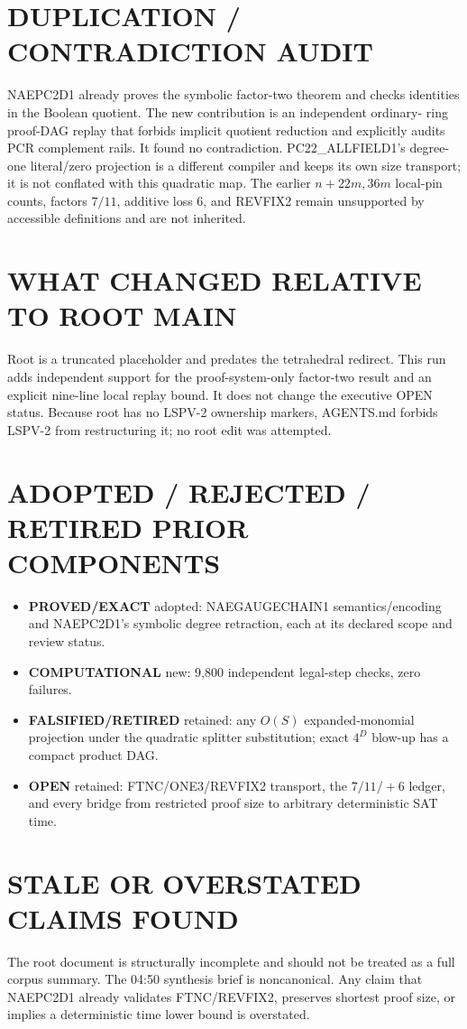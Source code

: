 \documentclass[11pt]{article}
\newcommand{\EXACT}{\textbf{PROVED/EXACT}}
\newcommand{\COMP}{\textbf{COMPUTATIONAL}}
\newcommand{\OPEN}{\textbf{OPEN}}
\newcommand{\RET}{\textbf{FALSIFIED/RETIRED}}
\begin{document}
\section{DUPLICATION / CONTRADICTION AUDIT}
NAEPC2D1 already proves the symbolic factor-two theorem and checks identities
in the Boolean quotient.  The new contribution is an independent ordinary-
ring proof-DAG replay that forbids implicit quotient reduction and explicitly
audits PCR complement rails.  It found no contradiction.  PC22\_ALLFIELD1's
degree-one literal/zero projection is a different compiler and keeps its own
size transport; it is not conflated with this quadratic map.  The earlier
$n+22m,36m$ local-pin counts, factors $7/11$, additive loss $6$, and REVFIX2
remain unsupported by accessible definitions and are not inherited.

\section{WHAT CHANGED RELATIVE TO ROOT MAIN}
Root is a truncated placeholder and predates the tetrahedral redirect.  This
run adds independent support for the proof-system-only factor-two result and
an explicit nine-line local replay bound.  It does not change the executive
OPEN status.  Because root has no LSPV-2 ownership markers, AGENTS.md forbids
LSPV-2 from restructuring it; no root edit was attempted.

\section{ADOPTED / REJECTED / RETIRED PRIOR COMPONENTS}
\begin{itemize}
\item \EXACT{} adopted: NAEGAUGECHAIN1 semantics/encoding and NAEPC2D1's
symbolic degree retraction, each at its declared scope and review status.
\item \COMP{} new: 9,800 independent legal-step checks, zero failures.
\item \RET{} retained: any $O(S)$ expanded-monomial projection under the
quadratic splitter substitution; exact $4^D$ blow-up has a compact product DAG.
\item \OPEN{} retained: FTNC/ONE3/REVFIX2 transport, the $7/11/+6$ ledger,
and every bridge from restricted proof size to arbitrary deterministic SAT time.
\end{itemize}

\section{STALE OR OVERSTATED CLAIMS FOUND}
The root document is structurally incomplete and should not be treated as a
full corpus summary.  The 04:50 synthesis brief is noncanonical.  Any claim
that NAEPC2D1 already validates FTNC/REVFIX2, preserves shortest proof size,
or implies a deterministic time lower bound is overstated.
\end{document}
